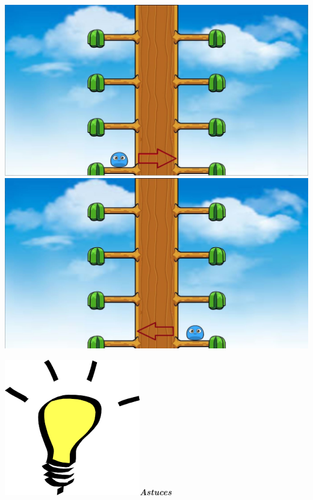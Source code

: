 \documentclass[french]{article}
\newcommand{\tips}{\includegraphics[scale=0.08]{tips}\textbf{\textit{Astuces\\}}}
\begin{document}
\begin{center}
	\includegraphics[scale=0.20]{step3-1}
	\includegraphics[scale=0.20]{step3-2}
\end{center}

\tips
\end{document}
